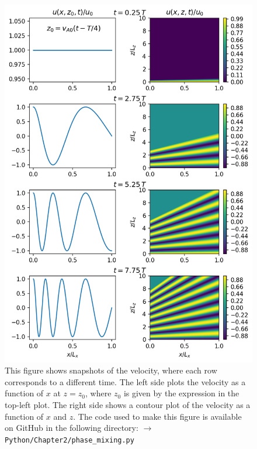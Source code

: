 \begin{figure}
    \centering
    \vspace{-20pt}
    \includegraphics[width=\textwidth,height=0.85\textheight,keepaspectratio]{figures/chapter02/phase_mixing.png}
    \vspace{-10pt}
    \caption{This figure shows snapshots of the velocity, where each row corresponds to a different time. The left side plots the velocity as a function of $x$ at $z=z_0$, where $z_0$ is given by the expression in the top-left plot. The right side shows a contour plot of the velocity as a function of $x$ and $z$. The code used to make this figure is available on GitHub in the following directory:\newline
    \texttt{$\rightarrow$ Python/Chapter2/phase\_mixing.py}}
    \vspace{-30pt}
    \label{fig:chap_2_phase_mixing}
\end{figure}

